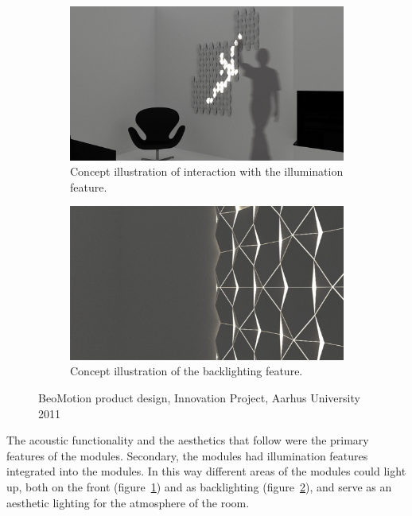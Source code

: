 \begin{figure}[h]
\begin{subfigure}{.44\textwidth}
		\centering
		\includegraphics[width=\linewidth]{figures/beomotion/concept_lighting}
		\caption{Concept illustration of interaction with the illumination feature.}
		\label{fig:beomotion:concept_light}
	\end{subfigure}%
	\hspace{.02\textwidth}
	\begin{subfigure}{.44\textwidth}
		\centering
		\includegraphics[width=\linewidth]{figures/beomotion/concept_backlight}
		\caption{Concept illustration of the backlighting feature.}
		\label{fig:beomotion:concept_backlight}
	\end{subfigure}
	\caption{BeoMotion product design, Innovation Project, Aarhus University 2011}
	\label{fig:beomotion}
\end{figure} 

The acoustic functionality and the aesthetics that follow were the primary features of the modules.
Secondary, the modules had illumination features integrated into the modules.
In this way different areas of the modules could light up, both on the front (figure~\ref{fig:beomotion:concept_light}) and as backlighting (figure~\ref{fig:beomotion:concept_backlight}), and serve as an aesthetic lighting for the atmosphere of the room.

